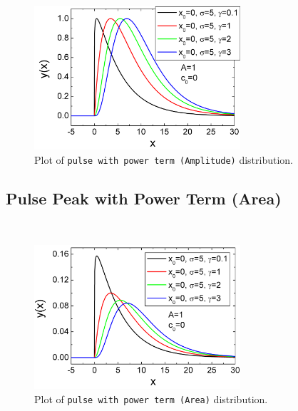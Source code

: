 \begin{figure}[htb]
\begin{center}
\includegraphics[width=0.6824\textwidth]{PulsePowerAmplitude.png}
\end{center}
\caption{Plot of \texttt{pulse with power term (Amplitude)} distribution.}
\label{fig:PulsePowerAmplitude}
\end{figure}

\clearpage
\subsection{Pulse Peak with Power Term (Area)} ~\\
\label{sec:pulsewithpowertermArea}

\begin{figure}[htb]
\begin{center}
\includegraphics[width=0.6824\textwidth]{PulsePowerArea.png}
\end{center}
\caption{Plot of \texttt{pulse with power term (Area)} distribution.}
\label{fig:PulsePowerArea}
\end{figure}

\clearpage
